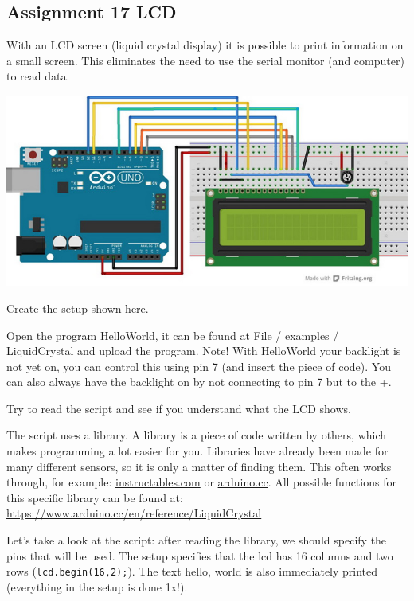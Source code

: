 \documentclass{arduino}
\begin{document}
\begin{widebox}
\subsection{Assignment 17 LCD}

With an LCD screen (liquid crystal display) it is possible to print information on a small screen. This eliminates the need to use the serial monitor (and computer) to read data.\vspace{\baselineskip}

\begin{minipage}{\linewidth}\centering
\includegraphics[width=0.7\linewidth]{37. Circuit display}
\end{minipage}

\begin{alphalist}
\item Create the setup shown here.

\item Open the program HelloWorld, it can be found at File / examples / LiquidCrystal and upload the program. Note! With HelloWorld your backlight is not yet on, you can control this using pin 7 (and insert the piece of code). You can also always have the backlight on by not connecting to pin 7 but to the +.

\item Try to read the script and see if you understand what the LCD shows.
\end{alphalist}

The script uses a library. A library is a piece of code written by others, which makes programming a lot easier for you. Libraries have already been made for many different sensors, so it is only a matter of finding them. This often works through, for example: \href{instructables.com}{instructables.com} or \href{arduino.cc}{arduino.cc}. All possible functions for this specific library can be found at: \href{arduino.cc/en/reference/LiquidCrystal}{https://www.arduino.cc/en/reference/LiquidCrystal}

Let's take a look at the script: after reading the library, we should specify the pins that will be used. The setup specifies that the lcd has 16 columns and two rows (\lstinline{lcd.begin(16,2);}). The text hello, world is also immediately printed (everything in the setup is done 1x!).


\end{widebox}
\end{document}
